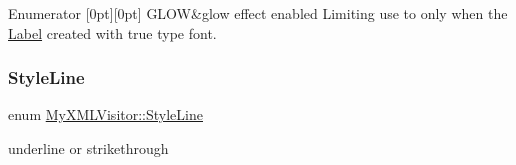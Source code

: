 \begin{DoxyEnumFields}{Enumerator}
[0pt][0pt]{}\mbox{\label{classMyXMLVisitor_a7f84d816c0b481e9cb35884996af6c2cac1f6db55d4aa7ba3eda97848763b6489}} 
G\+L\+OW&glow effect enabled  Limiting use to only when the \hyperlink{classLabel}{Label} created with true type font. \\
\hline

\end{DoxyEnumFields}
\mbox{\label{classMyXMLVisitor_a75a0b4e2723f798f35a0941ddba7c5a7}} 
\subsubsection{\texorpdfstring{Style\+Line}{StyleLine}\hspace{0.1cm}{\footnotesize\ttfamily [1/2]}}
{\footnotesize\ttfamily enum \hyperlink{classMyXMLVisitor_a75a0b4e2723f798f35a0941ddba7c5a7}{My\+X\+M\+L\+Visitor\+::\+Style\+Line}\hspace{0.3cm}{\ttfamily [strong]}}



underline or strikethrough 

